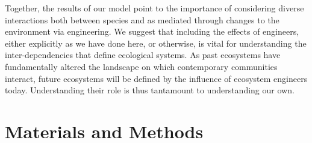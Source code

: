 \documentclass[9pt,twocolumn,twoside]{pnas-new}
\begin{document}
Together, the results of our model point to the importance of considering diverse interactions both between species and as mediated through changes to the environment via engineering.
We suggest that including the effects of engineers, either explicitly as we have done here, or otherwise, is vital for understanding the inter-dependencies that define ecological systems.
As past ecosystems have fundamentally altered the landscape on which contemporary communities interact, future ecosystems will be defined by the influence of ecosystem engineers today.
Understanding their role is thus tantamount to understanding our own.\\



\section*{Materials and Methods}
\end{document}
